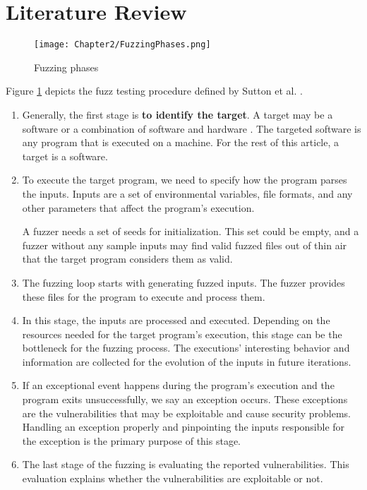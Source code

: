 \section{Literature Review} \label{sec:2.2}


\begin{figure}[!b]
    \texttt{[image: Chapter2/FuzzingPhases.png]}
    \centering
    \caption{Fuzzing phases}
    \label{fig:fuzz_phases}
\end{figure}

Figure \ref{fig:fuzz_phases} depicts the fuzz testing procedure defined by Sutton et al. \cite{sutton2007fuzzing}.  

\begin{enumerate}
    \item Generally, the first stage is \textbf{to identify the target}. A target may be a software or a combination of software and hardware \cite{song2019periscope}. The targeted software is any program that is executed on a machine. For the rest of this article, a target is a software.
    
    \item To execute the target program, we need to specify how the program parses the inputs. Inputs are a set of environmental variables, file formats, and any other parameters that affect the program's execution.
    
    A fuzzer needs a set of seeds for initialization. This set could be empty, and a fuzzer without any sample inputs may find valid fuzzed files out of thin air \cite{out_of_thin_air} that the target program considers them as valid.
    
    \item The fuzzing loop starts with generating fuzzed inputs. The fuzzer provides these files for the program to execute and process them.

    \item In this stage, the inputs are processed and executed. Depending on the resources needed for the target program's execution, this stage can be the bottleneck for the fuzzing process. The executions' interesting behavior and information are collected for the evolution of the inputs in future iterations.

    \item If an exceptional event happens during the program's execution and the program exits unsuccessfully, we say an exception occurs. These exceptions are the vulnerabilities that may be exploitable and cause security problems. Handling an exception properly and pinpointing the inputs responsible for the exception is the primary purpose of this stage.
    
    \item The last stage of the fuzzing is evaluating the reported vulnerabilities. This evaluation explains whether the vulnerabilities are exploitable or not.

\end{enumerate}

